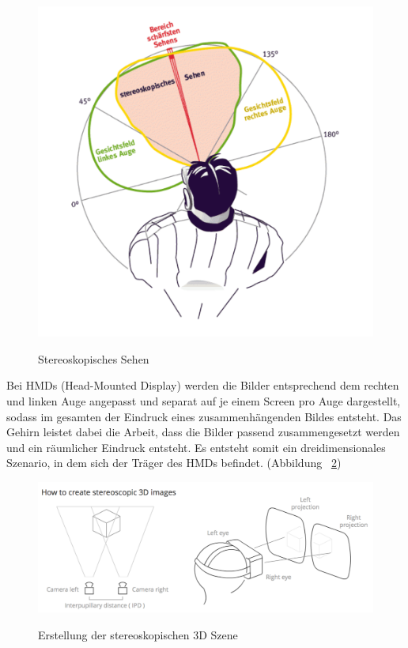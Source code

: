 \begin{figure}[ht]
\vspace*{1em}
\centering
\caption{Stereoskopisches Sehen}
\includegraphics[width=\textwidth]{images/stereoskopischesSehen.png}
\label{fig:stereoskopischesSehen} 
\end{figure}

Bei HMDs (Head-Mounted Display) werden die Bilder entsprechend dem rechten und linken Auge angepasst und separat auf je einem Screen pro Auge dargestellt, sodass im gesamten der Eindruck eines zusammenhängenden Bildes entsteht. Das Gehirn leistet dabei die Arbeit, dass die Bilder passend zusammengesetzt werden und ein räumlicher Eindruck entsteht. Es entsteht somit ein dreidimensionales Szenario, in dem sich der Träger des HMDs befindet. (Abbildung ~\ref{fig:howToCreate})

\begin{figure}[ht]
\vspace*{1em}
\centering
\caption{Erstellung der stereoskopischen 3D Szene}
\includegraphics[width=\textwidth]{images/howToCreate.png}
\label{fig:howToCreate} 
\end{figure}

